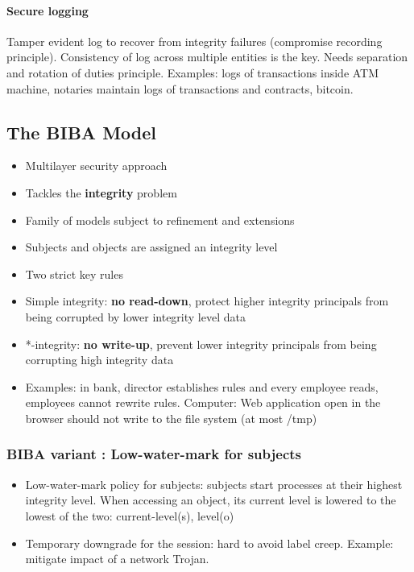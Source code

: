 \documentclass{article}
\newenvironment{myitemize}
{ \begin{itemize}
    \setlength{\itemsep}{005pt}
    \setlength{\parskip}{0pt}
    \setlength{\parsep}{0pt}     }
{ \end{itemize}                  }
\begin{document}
\begin{multicols}{2}
\paragraph{Secure logging}

Tamper evident log to recover from integrity failures (compromise recording principle). Consistency of log across multiple entities is the key. Needs separation and rotation of duties principle. Examples: logs of transactions inside ATM machine, notaries maintain logs of transactions and contracts, bitcoin. 


\subsection{The BIBA Model}

\begin{myitemize}
    \item Multilayer security approach
    \item Tackles the \textbf{integrity} problem
    \item Family of models subject to refinement and extensions
    \item Subjects and objects are assigned an integrity level
    \item Two strict key rules
    \item Simple integrity: \textbf{no read-down}, protect higher integrity principals from being corrupted by lower integrity level data
    \item *-integrity: \textbf{no write-up}, prevent lower integrity principals from being corrupting high integrity data
    \item Examples: in bank, director establishes rules and every employee reads, employees cannot rewrite rules. Computer: Web application open in the browser should not write to the file system (at most /tmp)
\end{myitemize}


\subsubsection{BIBA variant : Low-water-mark for subjects}

\begin{myitemize}
    \item Low-water-mark policy for subjects: subjects start processes at their highest integrity level. When accessing an object, its current level is lowered to the lowest of the two: current-level(s), level(o)
    \item Temporary downgrade for the session: hard to avoid label creep. Example: mitigate impact of a network Trojan. 
\end{myitemize}


\end{multicols}
\end{document}
